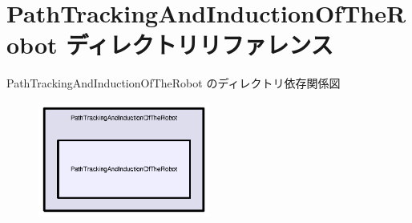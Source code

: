 \section{Path\-Tracking\-And\-Induction\-Of\-The\-Robot ディレクトリリファレンス}
\label{dir_d2cbe6861c52eb610edd18736eb43ce0}
Path\-Tracking\-And\-Induction\-Of\-The\-Robot のディレクトリ依存関係図\nopagebreak
\begin{figure}[H]
\begin{center}
\leavevmode
\includegraphics[width=160pt]{dir_d2cbe6861c52eb610edd18736eb43ce0_dep}
\end{center}
\end{figure}
